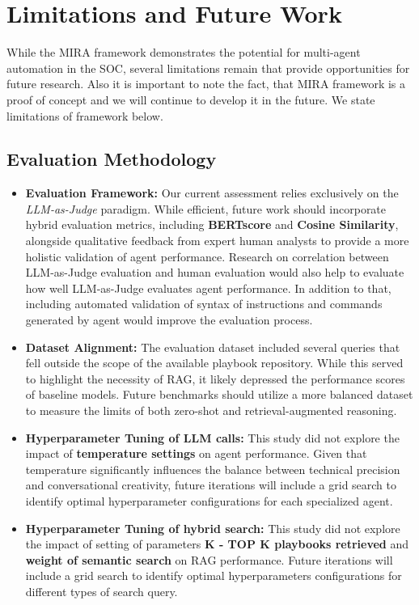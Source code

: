 \documentclass[conference]{IEEEtran}
\begin{document}
\section{Limitations and Future Work}\label{sec:limitations}

While the MIRA framework demonstrates the potential for multi-agent automation in the SOC, several limitations remain that provide opportunities for future research.
Also it is important to note the fact, that MIRA framework is a proof of concept and we will continue to develop it in the future. 
We state limitations of framework below.

\subsection{Evaluation Methodology}
\begin{itemize}
    \item \textbf{Evaluation Framework:} Our current assessment relies exclusively on the \textit{LLM-as-Judge} paradigm. 
    While efficient, future work should incorporate hybrid evaluation metrics, including \textbf{BERTscore} and \textbf{Cosine Similarity}, 
    alongside qualitative feedback from expert human analysts to provide a more holistic validation of agent performance. 
    Research on correlation between LLM-as-Judge evaluation and human evaluation would also help to evaluate how well LLM-as-Judge evaluates agent performance.
    In addition to that, including automated validation of syntax of instructions and commands generated by agent would improve the evaluation process.
    \item \textbf{Dataset Alignment:} The evaluation dataset included several queries that fell outside the scope of the available playbook repository. 
    While this served to highlight the necessity of RAG, it likely depressed the performance scores of baseline models. 
    Future benchmarks should utilize a more balanced dataset to measure the limits of both zero-shot and retrieval-augmented reasoning.
    \item \textbf{Hyperparameter Tuning of LLM calls:} This study did not explore the impact of \textbf{temperature settings} on agent performance.
    Given that temperature significantly influences the balance between technical precision and conversational creativity, 
    future iterations will include a grid search to identify optimal hyperparameter configurations for each specialized agent.
    \item \textbf{Hyperparameter Tuning of hybrid search:} This study did not explore the impact of setting of parameters 
    \textbf{K - TOP K playbooks retrieved} and \textbf{weight of semantic search} on RAG performance. 
    Future iterations will include a grid search to identify optimal hyperparameters configurations for different types of search query.
\end{itemize}
\end{document}
